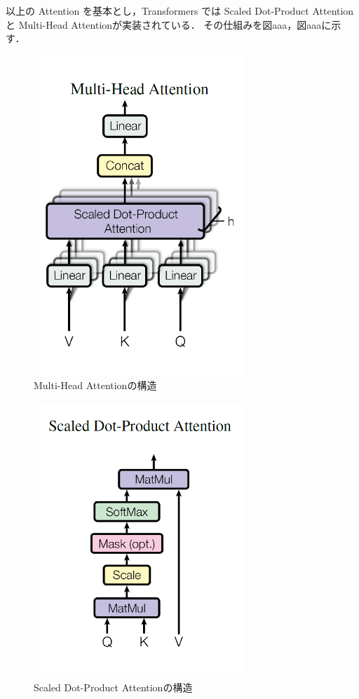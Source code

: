 以上の Attention を基本とし，Transformers では Scaled Dot-Product Attention と Multi-Head Attentionが実装されている．
その仕組みを図aaa，図aaaに示す．

\begin{figure}[H]
	\centering
	\includegraphics[width=80mm]{image/transformer-multi-head-attention.png}
	\caption{Multi-Head Attentionの構造}
	\label{mha}
\end{figure}

\begin{figure}[H]
	\centering
	\includegraphics[width=80mm]{image/transformer-scaled-dot-product-attention.png}
	\caption{Scaled Dot-Product Attentionの構造}
	\label{sda}
\end{figure}

